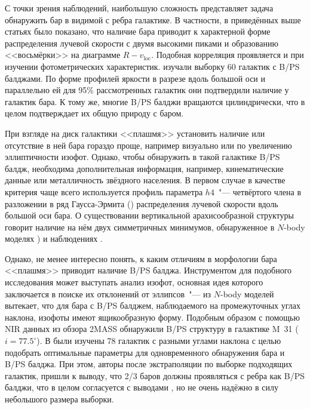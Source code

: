 \documentclass{trlnotes}
\begin{document}
С точки зрения наблюдений,
наибольшую сложность представляет задача обнаружить бар в видимой с ребра галактике. В частности, в приведённых выше статьях
было показано, что наличие бара приводит к характерной форме распределения лучевой скорости с двумя высокими пиками и образованию  <<восьмёрки>> на диаграмме $R - v_{\text{loc}}$. 
Подобная корреляция проявляется и при изучении фотометрических характеристик. \citet{lutticke2000a} изучали выборку 60 галактик с B/PS балджами. По форме
профилей яркости в разрезе вдоль большой оси и параллельно ей для 95\% рассмотренных галактик они  подтвердили наличие у галактик бара. 
К тому же, многие B/PS балджи вращаются цилиндрически, что в целом подтверждает их общую природу с баром. 
 
При взгляде на диск галактики <<плашмя>> установить наличие или отсутствие в ней бара гораздо проще, например визуально или по увеличению эллиптичности изофот. Однако, чтобы обнаружить в такой галактике B/PS балдж,  необходима дополнительная информация, например, кинематические данные или металличность звёздного населения. В первом случае в качестве критерия чаще всего используется профиль параметра
$h4$~"---  четвёртого члена в разложении в ряд Гаусса-Эрмита (\cite{vandermarel1993}) распределения лучевой
скорости вдоль большой оси бара. 
О существовании вертикальной арахисообразной структуры говорит наличие на
нём двух симметричных минимумов, обнаруженное в $N$-body моделях \citep{debattista2005,iannuzzi2015}) и наблюдениях \citep{mendez-abreu2008}.

Однако, не менее интересно понять, к каким отличиям в морфологии бара <<плашмя>> приводит наличие B/PS балджа. 
Инструментом для подобного исследования может выступать анализ изофот, основная идея которого заключается в поиске
их отклонений  от эллипсов~"--- из $N$-body моделей вытекает, что для бара с B/PS балджем,
наблюдаемого на промежуточных углах наклона, изофоты имеют ящикообразную форму. Подобным образом с помощью NIR данных из обзора 2MASS  \citet{beaton2007} обнаружили B/PS структуру в галактике M~31 ($i = 77.5^\circ$). В \citet{erwin2013} были изучены 78 галактик с разными углами наклона с целью подобрать оптимальные параметры для
одновременного обнаружения бара и B/PS балджа. При этом, авторы после экстраполяции по выборке
подходящих галактик, пришли к выводу, что 2/3 баров должны проявляться с ребра как B/PS балджи, что в
целом согласуется с выводами \citet{lutticke2000a}, но не очень надёжно в силу небольшого размера выборки.
\end{document}
